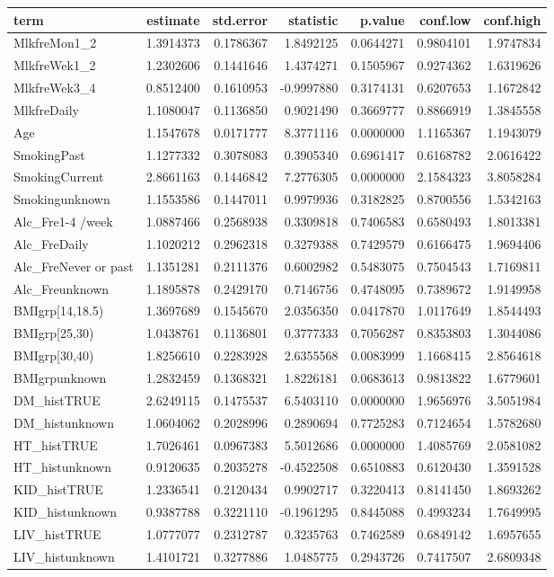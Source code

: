 \documentclass[]{article}
\begin{document}
\begin{longtable}[]{@{}lrrrrrr@{}}
\toprule
term & estimate & std.error & statistic & p.value & conf.low &
conf.high\tabularnewline
\midrule
\endhead
MlkfreMon1\_2 & 1.3914373 & 0.1786367 & 1.8492125 & 0.0644271 &
0.9804101 & 1.9747834\tabularnewline
MlkfreWek1\_2 & 1.2302606 & 0.1441646 & 1.4374271 & 0.1505967 &
0.9274362 & 1.6319626\tabularnewline
MlkfreWek3\_4 & 0.8512400 & 0.1610953 & -0.9997880 & 0.3174131 &
0.6207653 & 1.1672842\tabularnewline
MlkfreDaily & 1.1080047 & 0.1136850 & 0.9021490 & 0.3669777 & 0.8866919
& 1.3845558\tabularnewline
Age & 1.1547678 & 0.0171777 & 8.3771116 & 0.0000000 & 1.1165367 &
1.1943079\tabularnewline
SmokingPast & 1.1277332 & 0.3078083 & 0.3905340 & 0.6961417 & 0.6168782
& 2.0616422\tabularnewline
SmokingCurrent & 2.8661163 & 0.1446842 & 7.2776305 & 0.0000000 &
2.1584323 & 3.8058284\tabularnewline
Smokingunknown & 1.1553586 & 0.1447011 & 0.9979936 & 0.3182825 &
0.8700556 & 1.5342163\tabularnewline
Alc\_Fre1-4 /week & 1.0887466 & 0.2568938 & 0.3309818 & 0.7406583 &
0.6580493 & 1.8013381\tabularnewline
Alc\_FreDaily & 1.1020212 & 0.2962318 & 0.3279388 & 0.7429579 &
0.6166475 & 1.9694406\tabularnewline
Alc\_FreNever or past & 1.1351281 & 0.2111376 & 0.6002982 & 0.5483075 &
0.7504543 & 1.7169811\tabularnewline
Alc\_Freunknown & 1.1895878 & 0.2429170 & 0.7146756 & 0.4748095 &
0.7389672 & 1.9149958\tabularnewline
BMIgrp{[}14,18.5) & 1.3697689 & 0.1545670 & 2.0356350 & 0.0417870 &
1.0117649 & 1.8544493\tabularnewline
BMIgrp{[}25,30) & 1.0438761 & 0.1136801 & 0.3777333 & 0.7056287 &
0.8353803 & 1.3044086\tabularnewline
BMIgrp{[}30,40) & 1.8256610 & 0.2283928 & 2.6355568 & 0.0083999 &
1.1668415 & 2.8564618\tabularnewline
BMIgrpunknown & 1.2832459 & 0.1368321 & 1.8226181 & 0.0683613 &
0.9813822 & 1.6779601\tabularnewline
DM\_histTRUE & 2.6249115 & 0.1475537 & 6.5403110 & 0.0000000 & 1.9656976
& 3.5051984\tabularnewline
DM\_histunknown & 1.0604062 & 0.2028996 & 0.2890694 & 0.7725283 &
0.7124654 & 1.5782680\tabularnewline
HT\_histTRUE & 1.7026461 & 0.0967383 & 5.5012686 & 0.0000000 & 1.4085769
& 2.0581082\tabularnewline
HT\_histunknown & 0.9120635 & 0.2035278 & -0.4522508 & 0.6510883 &
0.6120430 & 1.3591528\tabularnewline
KID\_histTRUE & 1.2336541 & 0.2120434 & 0.9902717 & 0.3220413 &
0.8141450 & 1.8693262\tabularnewline
KID\_histunknown & 0.9387788 & 0.3221110 & -0.1961295 & 0.8445088 &
0.4993234 & 1.7649995\tabularnewline
LIV\_histTRUE & 1.0777077 & 0.2312787 & 0.3235763 & 0.7462589 &
0.6849142 & 1.6957655\tabularnewline
LIV\_histunknown & 1.4101721 & 0.3277886 & 1.0485775 & 0.2943726 &
0.7417507 & 2.6809348\tabularnewline

\end{longtable}
\end{document}

